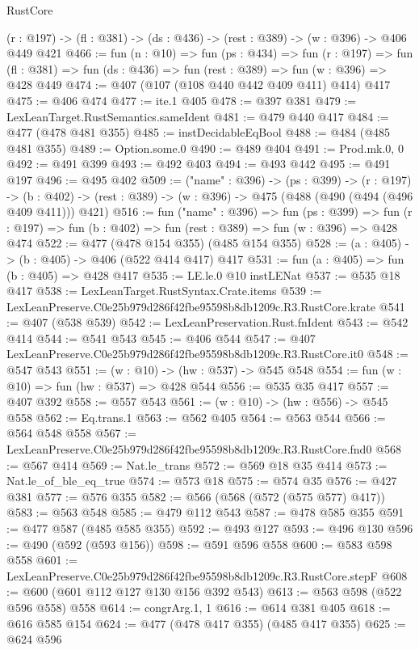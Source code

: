\begin{lexlean}{RustCore}
\begin{coremodule}
  (r : @197) -> (fl : @381) -> (ds : @436) -> (rest : @389) -> (w : @396) -> @406 @449 @421
@466 := fun (n : @10) =>
  fun (ps : @434) =>
  fun (r : @197) =>
  fun (fl : @381) => fun (ds : @436) => fun (rest : @389) => fun (w : @396) => @428 @449
@474 := @407 (@107 (@108 @440 @442 @409 @411) @414) @417
@475 := @406 @474
@477 := ite.{1} @405
@478 := @397 @381
@479 := LexLeanTarget.RustSemantics.sameIdent
@481 := @479 @440 @417
@484 := @477 (@478 @481 @355)
@485 := instDecidableEqBool
@488 := @484 (@485 @481 @355)
@489 := Option.some.{0}
@490 := @489 @404
@491 := Prod.mk.{0, 0}
@492 := @491 @399
@493 := @492 @403
@494 := @493 @442
@495 := @491 @197
@496 := @495 @402
@509 := ("name" : @396) ->
  (ps : @399) ->
  (r : @197) ->
  (b : @402) -> (rest : @389) -> (w : @396) -> @475 (@488 (@490 (@494 (@496 @409 @411))) @421)
@516 := fun ("name" : @396) =>
  fun (ps : @399) =>
  fun (r : @197) => fun (b : @402) => fun (rest : @389) => fun (w : @396) => @428 @474
@522 := @477 (@478 @154 @355) (@485 @154 @355)
@528 := (a : @405) -> (b : @405) -> @406 (@522 @414 @417) @417
@531 := fun (a : @405) => fun (b : @405) => @428 @417
@535 := LE.le.{0} @10 instLENat
@537 := @535 @18 @417
@538 := LexLeanTarget.RustSyntax.Crate.items
@539 := LexLeanPreserve.C0e25b979d286f42fbe95598b8db1209c.R3.RustCore.krate
@541 := @407 (@538 @539)
@542 := LexLeanPreservation.Rust.fnIdent
@543 := @542 @414
@544 := @541 @543
@545 := @406 @544
@547 := @407 LexLeanPreserve.C0e25b979d286f42fbe95598b8db1209c.R3.RustCore.it0
@548 := @547 @543
@551 := (w : @10) -> (hw : @537) -> @545 @548
@554 := fun (w : @10) => fun (hw : @537) => @428 @544
@556 := @535 @35 @417
@557 := @407 @392
@558 := @557 @543
@561 := (w : @10) -> (hw : @556) -> @545 @558
@562 := Eq.trans.{1}
@563 := @562 @405
@564 := @563 @544
@566 := @564 @548 @558
@567 := LexLeanPreserve.C0e25b979d286f42fbe95598b8db1209c.R3.RustCore.fnd0
@568 := @567 @414
@569 := Nat.le_trans
@572 := @569 @18 @35 @414
@573 := Nat.le_of_ble_eq_true
@574 := @573 @18
@575 := @574 @35
@576 := @427 @381
@577 := @576 @355
@582 := @566 (@568 (@572 (@575 @577) @417))
@583 := @563 @548
@585 := @479 @112 @543
@587 := @478 @585 @355
@591 := @477 @587 (@485 @585 @355)
@592 := @493 @127
@593 := @496 @130
@596 := @490 (@592 (@593 @156))
@598 := @591 @596 @558
@600 := @583 @598 @558
@601 := LexLeanPreserve.C0e25b979d286f42fbe95598b8db1209c.R3.RustCore.stepF
@608 := @600 (@601 @112 @127 @130 @156 @392 @543)
@613 := @563 @598 (@522 @596 @558) @558
@614 := congrArg.{1, 1}
@616 := @614 @381 @405
@618 := @616 @585 @154
@624 := @477 (@478 @417 @355) (@485 @417 @355)
@625 := @624 @596

\end{coremodule}
\end{lexlean}
